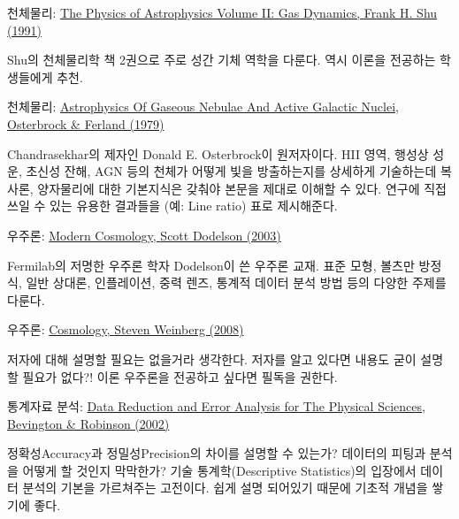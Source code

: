 \begin{packed_item}
\item 천체물리:
  \href{http://www.amazon.com/Physics-Astrophysics-II-Gas-Dynamics/dp/0935702652}{The
    Physics of Astrophysics Volume II: Gas Dynamics, \textsf{Frank H. Shu
      (1991)}}
\begin{packed_item}
\item Shu의 천체물리학 책 2권으로 주로 성간 기체 역학을 다룬다. 역시 이론을
  전공하는 학생들에게 추천.
\end{packed_item}

\item 천체물리:
  \href{http://www.amazon.com/Astrophysics-Gaseous-Nebulae-Active-Galactic/dp/1891389343}{Astrophysics
    Of Gaseous Nebulae And Active Galactic Nuclei, \textsf{Osterbrock \& Ferland
      (1979)}}
\begin{packed_item}
\item Chandrasekhar의 제자인 Donald E. Osterbrock이 원저자이다. HII 영역, 행성상
  성운, 초신성 잔해, AGN 등의 천체가 어떻게 빛을 방출하는지를 상세하게 기술하는데
  복사론, 양자물리에 대한 기본지식은 갖춰야 본문을 제대로 이해할 수 있다. 연구에
  직접 쓰일 수 있는 유용한 결과들을 (예: Line ratio) 표로 제시해준다.
\end{packed_item}

\item 우주론:
  \href{http://www.amazon.com/Modern-Cosmology-Scott-Dodelson/dp/0122191412}{Modern
    Cosmology, \textsf{Scott Dodelson (2003)}}
\begin{packed_item}
\item Fermilab의 저명한 우주론 학자 Dodelson이 쓴 우주론 교재. 표준 모형, 볼츠만
  방정식, 일반 상대론, 인플레이션, 중력 렌즈, 통계적 데이터 분석 방법 등의 다양한
  주제를 다룬다.
\end{packed_item}

\item 우주론:
  \href{http://www.amazon.com/Cosmology-Steven-Weinberg/dp/0198526822}{Cosmology,
    \textsf{Steven Weinberg (2008)}}
\begin{packed_item}
\item 저자에 대해 설명할 필요는 없을거라 생각한다. 저자를 알고 있다면 내용도 굳이
  설명할 필요가 없다?! 이론 우주론을 전공하고 싶다면 필독을 권한다.
\end{packed_item}

\item 통계자료 분석:
  \href{http://www.amazon.com/Reduction-Error-Analysis-Physical-Sciences/dp/0079112439}{Data
    Reduction and Error Analysis for The Physical Sciences, \textsf{Bevington \&
      Robinson (2002)}}
\begin{packed_item}
\item 정확성Accuracy과 정밀성Precision의 차이를 설명할 수 있는가? 데이터의 피팅과
  분석을 어떻게 할 것인지 막막한가? 기술 통계학(Descriptive Statistics)의
  입장에서 데이터 분석의 기본을 가르쳐주는 고전이다. 쉽게 설명 되어있기 때문에
  기초적 개념을 쌓기에 좋다.
\end{packed_item}


\end{packed_item}
